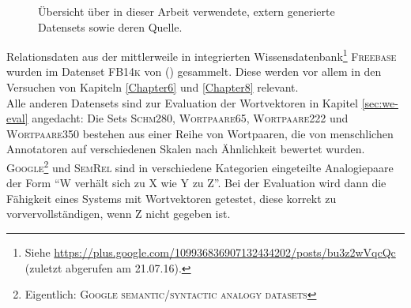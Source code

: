   \begin{figure}[h]
    \centering
    \def\arraystretch{1.5}
  \caption[Übersicht über verwendete vorgefertigte Datensets]{Übersicht über in dieser Arbeit verwendete, extern generierte
  Datensets sowie deren Quelle.\label{fig:datasets}}
  \end{figure}

  Relationsdaten aus der mittlerweile in  integrierten Wissensdatenbank\footnote{Siehe
  \url{https://plus.google.com/109936836907132434202/posts/bu3z2wVqcQc} (zuletzt abgerufen am 21.07.16).}
   \textsc{Freebase} wurden im Datenset \textsc{FB14k} von (\cite{bordes2013translating}) gesammelt.
  Diese werden vor allem in den Versuchen von Kapiteln \ref{Chapter6} und \ref{Chapter8} relevant.\\

  Alle anderen Datensets sind zur Evaluation der Wortvektoren in Kapitel \ref{sec:we-eval} angedacht: Die Sets
  \textsc{Schm280}, \textsc{Wortpaare65}, \textsc{Wortpaare222} und \textsc{Wortpaare350} bestehen aus einer Reihe
  von Wortpaaren, die von menschlichen Annotatoren auf verschiedenen Skalen nach Ähnlichkeit bewertet wurden.\\
  \textsc{Google}\footnote{Eigentlich: \textsc{Google semantic/syntactic analogy datasets}} und \textsc{SemRel} sind
  in verschiedene Kategorien eingeteilte Analogiepaare der Form ``W verhält sich zu X wie Y zu Z''. Bei der Evaluation
  wird dann die Fähigkeit eines Systems mit Wortvektoren getestet, diese korrekt zu vorvervollständigen, wenn Z nicht
  gegeben ist.


